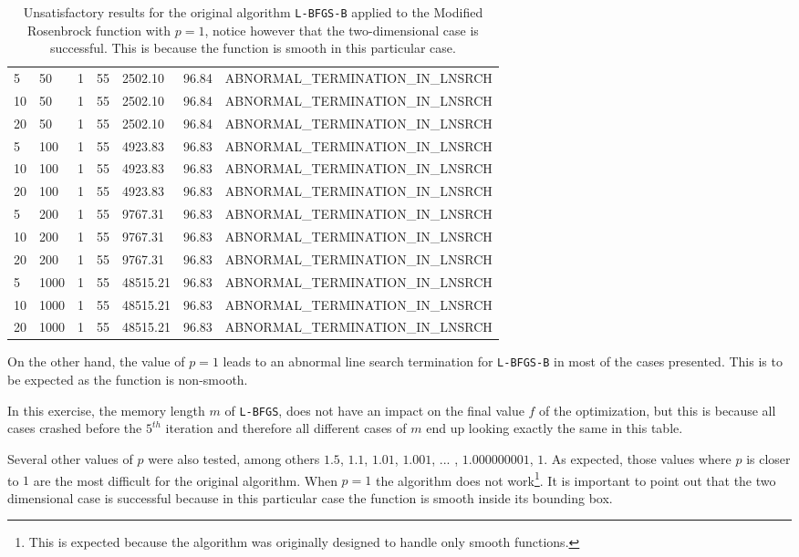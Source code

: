 \begin{center}
\begin{table}
\begin{tabular}{|l|l|l|l|p{3.5cm}|p{6cm}|}
5 & 50 & 1 & 55 & 2502.10 & 96.84 & ABNORMAL\_TERMINATION\_IN\_LNSRCH \\
10 & 50 & 1 & 55 & 2502.10 & 96.84 & ABNORMAL\_TERMINATION\_IN\_LNSRCH \\
20 & 50 & 1 & 55 & 2502.10 & 96.84 & ABNORMAL\_TERMINATION\_IN\_LNSRCH \\
5 & 100 & 1 & 55 & 4923.83 & 96.83 & ABNORMAL\_TERMINATION\_IN\_LNSRCH \\
10 & 100 & 1 & 55 & 4923.83 & 96.83 & ABNORMAL\_TERMINATION\_IN\_LNSRCH \\
20 & 100 & 1 & 55 & 4923.83 & 96.83 & ABNORMAL\_TERMINATION\_IN\_LNSRCH \\
5 & 200 & 1 & 55 & 9767.31 & 96.83 & ABNORMAL\_TERMINATION\_IN\_LNSRCH \\
10 & 200 & 1 & 55 & 9767.31 & 96.83 & ABNORMAL\_TERMINATION\_IN\_LNSRCH \\
20 & 200 & 1 & 55 & 9767.31 & 96.83 & ABNORMAL\_TERMINATION\_IN\_LNSRCH \\
5 & 1000 & 1 & 55 & 48515.21 & 96.83 & ABNORMAL\_TERMINATION\_IN\_LNSRCH \\
10 & 1000 & 1 & 55 & 48515.21 & 96.83 & ABNORMAL\_TERMINATION\_IN\_LNSRCH \\
20 & 1000 & 1 & 55 & 48515.21 & 96.83 & ABNORMAL\_TERMINATION\_IN\_LNSRCH \\
  \hline
    \end{tabular}
    \caption[Modified Rosenbrock with $p = 1$]{Unsatisfactory results for the original algorithm \texttt{L-BFGS-B} applied to the Modified Rosenbrock function with $p = 1$, notice however that the two-dimensional case is successful.  This is because the function is smooth in this particular case.}
  \label{pequal1}
  \end{table}
\end{center}

On the other hand, the value of $p = 1$ leads to an abnormal line search termination for \texttt{L-BFGS-B} in most of the cases presented. This is to be expected as the function is non-smooth.

In this exercise, the memory length $m$ of \texttt{L-BFGS}, does not have an impact on the final value $f$ of the optimization, but this is because all cases crashed before the $5^{th}$ iteration and therefore all different cases of $m$ end up looking exactly the same in this table.

Several other values of $p$ were also tested, among others $1.5$, $1.1$, $1.01$, $1.001$, ... , $1.000000001$, $1$. As expected, those values where $p$ is closer to $1$ are the most difficult for the original algorithm. When $p=1$ the algorithm does not work\footnote{This is expected because the algorithm was originally designed to handle only smooth functions.}. It is important to point out that the two dimensional case is successful because in this particular case the function is smooth inside its bounding box.

